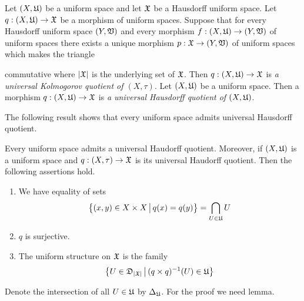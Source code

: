 \begin{definition}
Let $(X,{\mathfrak U})$ be a uniform space and let ${\mathfrak X}$ be a Hausdorff uniform space. Let $q:\left(X,{\mathfrak U}\right)\rightarrow {\mathfrak X}$ be a morphism of uniform spaces. Suppose that for every Hausdorff uniform space $\left(Y,{\mathfrak V}\right)$ and every morphism $f:\left(X,{\mathfrak U}\right)\rightarrow \left(Y,{\mathfrak V}\right)$ of uniform spaces there exists a unique morphism $p:{\mathfrak X} \rightarrow \left(Y,{\mathfrak V}\right)$ of uniform spaces which makes the triangle
\begin{center}
\end{center}
commutative where $|{\mathfrak X}|$ is the underlying set of ${\mathfrak X}$. Then $q:\left(X,{\mathfrak U}\right)\rightarrow {\mathfrak X}$ is \textit{a universal Kolmogorov quotient of $\left(X,\tau\right)$}.
Let $(X,{\mathfrak U})$ be a uniform space. Then a morphism $q:\left(X,{\mathfrak U}\right)\rightarrow {\mathfrak X}$ is \textit{a universal Hausdorff quotient of $\left(X,{\mathfrak U}\right)$}.
\end{definition}
\noindent
The following result shows that every uniform space admits universal Hausdorff quotient.

\begin{theorem}\label{theorem:universal_Hausdorff_quotient}
Every uniform space admits a universal Haudorff quotient. Moreover, if $(X,{\mathfrak U})$ is a uniform space and $q:\left(X,\tau\right) \rightarrow {\mathfrak X}$ is its universal Haudorff quotient. Then the following assertions hold.
\begin{enumerate}[label=\emph{\textbf{(\arabic*)}}, leftmargin=*]
\item We have equality of sets
$$\big\{(x,y)\in X\times X\,\big|\,q(x) = q(y)\big\} = \bigcap_{U\in {\mathfrak U}}U$$
\item $q$ is surjective.
\item The uniform structure on ${\mathfrak X}$ is the family
$$\big\{U \in {\mathfrak D}_{|{\mathfrak X}|}\,\big|\,(q\times q)^{-1}(U) \in {\mathfrak U}\big\}$$
\end{enumerate}
\end{theorem}
\noindent
Denote the intersection of all $U \in {\mathfrak U}$ by $\Delta_{{\mathfrak U}}$. For the proof we need lemma.

